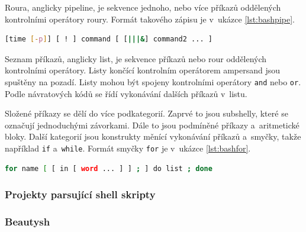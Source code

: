 \documentclass[thesis=M,czech]{FITthesis}[2012/06/26]
\begin{document}
Roura, anglicky pipeline, je sekvence jednoho, nebo více příkazů oddělených kontrolními operátory roury. Formát takového zápisu je v~ukázce \ref{lst:bashpipe}.

\noindent
\begin{minipage}{\linewidth}
\begin{lstlisting}[language=bash, caption={Formát roury v~Bashi}, label={lst:bashpipe}]
[time [-p]] [ ! ] command [ [|||&] command2 ... ]
\end{lstlisting}
\end{minipage}

Seznam příkazů, anglicky list, je sekvence příkazů nebo rour oddělených kontrolními operátory. Listy končící kontrolním operátorem ampersand jsou spuštěny na pozadí. Listy mohou být spojeny kontrolními operátory \texttt{and} nebo \texttt{or}. Podle návratových kódů se řídí vykonávání dalších příkazů v~listu.

Složené příkazy se dělí do více podkategorií. Zaprvé to jsou subshelly, které se označují jednoduchými závorkami. Dále to jsou podmíněné příkazy a~aritmetické bloky. Další kategorií jsou konstrukty měnící vykonávání příkazů a~smyčky, takže například \texttt{if} a~\texttt{while}. Formát smyčky \texttt{for} je v~ukázce \ref{lst:bashfor}.

\noindent
\begin{minipage}{\linewidth}
\begin{lstlisting}[language=bash, caption={Formát jedné varianty cyklu for v~Bashi}, label={lst:bashfor}]
for name [ [ in [ word ... ] ] ; ] do list ; done
\end{lstlisting}
\end{minipage}




\subsubsection{Projekty parsující shell skripty}

%
\subsubsection{Beautysh}
\end{document}
